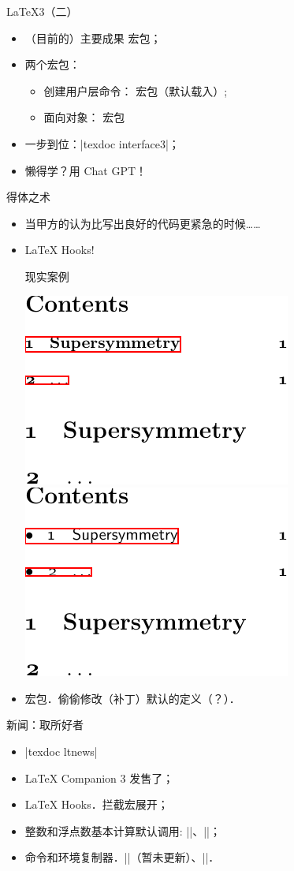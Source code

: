 \begin{frame}[fragile]{\LaTeX{}3（二）}
	\begin{itemize}
		\item （目前的）主要成果  宏包；
		\item 两个宏包：
		      \begin{itemize}
			      \item 创建用户层命令： 宏包（默认载入）;
			      \item 面向对象： 宏包
		      \end{itemize}
		\item 一步到位：|texdoc interface3|；
		\item<+-> 懒得学？用 Chat GPT！
	\end{itemize}
\end{frame}

\begin{frame}{得体之术}
	\begin{itemize}
		\item 当甲方的认为比写出良好的代码更紧急的时候……
		\item<+-> \LaTeX{} Hooks!
			\begin{block}{现实案例}
				\begin{center}
					\includegraphics[width = .35\textwidth]{images/Oldtoc.pdf} \ccwd\includegraphics[width = .35\textwidth]{images/Newtoc.pdf}
				\end{center}
			\end{block}
		\item<+->  宏包．偷偷修改（补丁）默认的定义（？）．
	\end{itemize}
\end{frame}

\begin{frame}[fragile]{新闻：取所好者}
	\begin{itemize}
		\item<+-> |texdoc ltnews|
		\item<+-> LaTeX Companion 3 发售了；
		\item<+-> \LaTeX{} Hooks．拦截宏展开；
		\item<+-> 整数和浮点数基本计算默认调用: |\inteval|、|\fpeval|；
		\item<+-> 命令和环境复制器．|\NewEnvironmentCopy|（暂未更新）、|\NewCommandCopy|．
	\end{itemize}
\end{frame}

